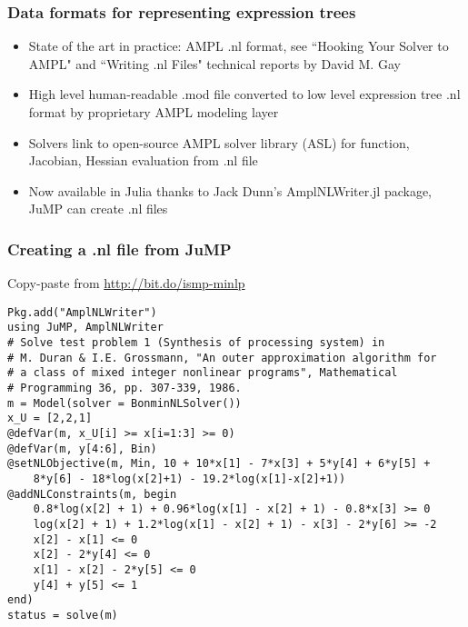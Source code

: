 \documentclass[compressed,dvips,letter]{beamer}
\begin{document}
\begin{frame}[fragile]\frametitle{Data formats for representing expression trees}

\begin{itemize}
\item State of the art in practice: AMPL .nl format, see ``Hooking Your Solver to AMPL" and ``Writing .nl Files" technical reports by David M. Gay
\item High level human-readable .mod file converted to low level expression tree .nl format by proprietary AMPL modeling layer
\item Solvers link to open-source AMPL solver library (ASL) for function, Jacobian, Hessian evaluation from .nl file
\item Now available in Julia thanks to Jack Dunn's AmplNLWriter.jl package, JuMP can create .nl files
\end{itemize}

\end{frame}
%
%


\begin{frame}[fragile]\frametitle{Creating a .nl file from JuMP}
Copy-paste from \url{http://bit.do/ismp-minlp}
{\fontsize{8.8pt}{0} \selectfont
\begin{verbatim}
Pkg.add("AmplNLWriter")
using JuMP, AmplNLWriter
# Solve test problem 1 (Synthesis of processing system) in
# M. Duran & I.E. Grossmann, "An outer approximation algorithm for
# a class of mixed integer nonlinear programs", Mathematical
# Programming 36, pp. 307-339, 1986.
m = Model(solver = BonminNLSolver())
x_U = [2,2,1]
@defVar(m, x_U[i] >= x[i=1:3] >= 0)
@defVar(m, y[4:6], Bin)
@setNLObjective(m, Min, 10 + 10*x[1] - 7*x[3] + 5*y[4] + 6*y[5] +
    8*y[6] - 18*log(x[2]+1) - 19.2*log(x[1]-x[2]+1))
@addNLConstraints(m, begin
    0.8*log(x[2] + 1) + 0.96*log(x[1] - x[2] + 1) - 0.8*x[3] >= 0
    log(x[2] + 1) + 1.2*log(x[1] - x[2] + 1) - x[3] - 2*y[6] >= -2
    x[2] - x[1] <= 0
    x[2] - 2*y[4] <= 0
    x[1] - x[2] - 2*y[5] <= 0
    y[4] + y[5] <= 1
end)
status = solve(m)
\end{verbatim}
}
\end{frame}
%
%
\end{document}
